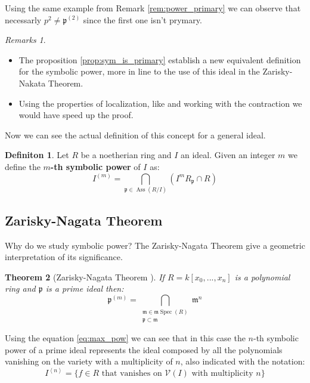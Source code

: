 \documentclass[]{article}
\theoremstyle{plain}
\newtheorem{teo}{Theorem}[section]
\theoremstyle{remark}
\newtheorem{rems}[rem]{Remarks}
\theoremstyle{definition}
\newtheorem{deff}[teo]{Definiton}
\newcommand{\p}{\mathfrak{p}}
\newcommand{\mm}{\mathfrak{m}}
\DeclareMathOperator{\Ass}{Ass}
\DeclareMathOperator{\Spec}{Spec}
\begin{document}
	Using the same example from Remark \ref{rem:power_primary} we can observe that necessarly $ p^2 \neq \p^{(2)}  $ since the first one isn't prymary. 
	
	\begin{rems}
		\begin{itemize}
		\item The proposition \ref{prop:sym_is_primary} establish a new equivalent definition for the symbolic power, more in line to the use of this ideal in the Zarisky-Nakata Theorem.
		\item Using the properties of localization, like \cite[Proposition 4.8]{AMCD} and working with the contraction we would have speed up the proof.
		\end{itemize}
	\end{rems}
	
Now we can see the actual definition of this concept for a general ideal.

\begin{deff}
	Let $ R $ be a noetherian ring and $ I $ an ideal. Given an integer $ m $ we define the \textbf{$ m $-th symbolic power} of $ I $ as:
	\begin{equation}\label{eq:sym_pow_def}
		I^{(m)} = \bigcap_{\p \in \Ass(R/I) } (I^m R_\p \cap R)
	\end{equation}
\end{deff}



\subsection{Zarisky-Nagata Theorem}
Why do we study symbolic power? The Zarisky-Nagata Theorem give a geometric interpretation of its significance.

\begin{teo}[Zarisky-Nagata Theorem \cite{Zar49, Nagata62}]
	If $ R = k[x_0 , ... , x_n] $ is a polynomial ring and $ \p $ is a prime ideal then:
	\begin{equation}\label{eq:zar_nag_teo}
	\p^{(m)} = \bigcap_{\substack{ \mm \in \mm\Spec (R)\\ \p \subset \mm}} \mm ^n
	\end{equation}
\end{teo}

Using the equation \ref{eq:max_pow} we can see that in this case the $ n $-th symbolic power of a prime ideal represents the ideal composed by all the polynomials vanishing on the variety with a multiplicity of $ n $, also indicated with the notation:
\begin{equation}\label{eq:ideal_vanish}
	I^{\left<n\right>} = \{ f \in R \text{ that vanishes on } \mathcal{V}(I) \text{ with multiplicity } n\}
\end{equation}
\end{document}
